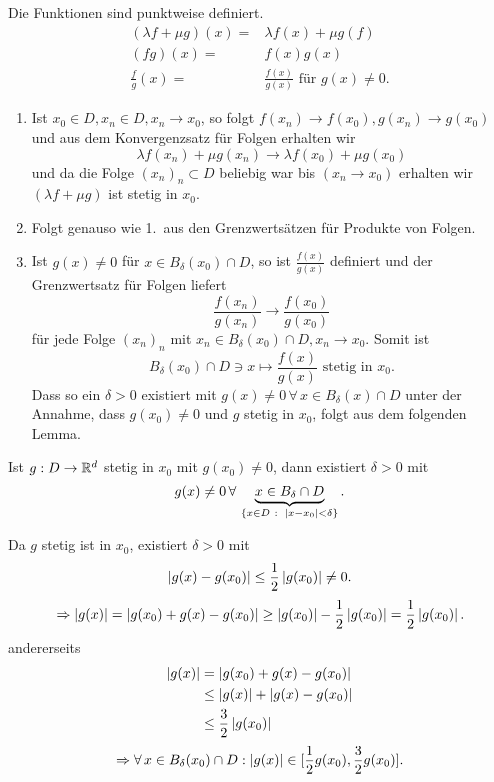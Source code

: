 \documentclass[../ana1.tex]{subfiles}
\begin{document}
\begin{bew}
    Die Funktionen sind punktweise definiert.
    \begin{align*}
        (\lambda f + \mu g)(x) = &\lambda f(x) + \mu g(f) \\
        (f g)(x) = &f(x) g(x) \\
        \frac{f}{g}(x) = &\frac{f(x)}{g(x)} \text{ für } g(x) \neq 0.
    \end{align*}
    \begin{enumerate}
        \item Ist \( x_0 \in D, x_n \in D, x_n \rightarrow x_0 \), 
        so folgt \( f(x_n) \rightarrow f(x_0), g(x_n) \rightarrow g(x_0) \)
        und aus dem Konvergenzsatz für Folgen erhalten wir
        \[ \lambda f(x_n) + \mu g(x_n) \rightarrow 
        \lambda f(x_0) + \mu g(x_0) \]
        und da die Folge \( {(x_n)}_n \subset D \) beliebig war 
        bis \( (x_n \rightarrow x_0) \) erhalten wir 
        \( (\lambda f + \mu g) \) ist stetig in \( x_0 \).
        \item Folgt genauso wie 1.\ aus den Grenzwertsätzen 
        für Produkte von Folgen.
        \item Ist \( g(x) \neq 0 \) für \( x\in B_\delta(x_0) \cap D \),
        so ist \( \frac{f(x)}{g(x)} \) definiert und der Grenzwertsatz
        für Folgen liefert
        \[ \frac{f(x_n)}{g(x_n)} \rightarrow \frac{f(x_0)}{g(x_0)} \]
        für jede Folge \( {(x_n)}_n \) mit \( x_n \in B_\delta(x_0) 
        \cap D, x_n \rightarrow x_0 \). Somit ist 
        \[ B_\delta(x_0) \cap D \ni x \mapsto \frac{f(x)}{g(x)} 
        \text{ stetig in } x_0. \]
        Dass so ein \( \delta > 0 \) existiert mit \( g(x) \neq 0 
        \,\forall \, x \in B_\delta(x) \cap D \) unter der Annahme, 
        dass \( g(x_0) \neq 0 \) und \(g\) stetig in \( x_0 \), 
        folgt aus dem folgenden Lemma.
    \end{enumerate}
\end{bew}
\begin{lem}
    Ist \( g: D\rightarrow \mathbb{R}^d \) stetig in \( x_0 \) mit 
    \( g(x_0) \neq 0 \), dann existiert \( \delta > 0 \) mit 
    \[ g(x) \neq 0 \,\forall \, \underbrace{x\in B_\delta \cap D
    }_{ \{x\in D \;\colon \; \left|x-x_0\right| < \delta \} }. \]
\end{lem}
\begin{bew}
    Da \( g \) stetig ist in \( x_0 \), existiert \( \delta > 0 \) mit 
    \[ \left| g(x) - g(x_0) \right| \leq \frac{1}{2} \left|g(x_0)\right| \neq 0. \]
    \[ \Rightarrow \left| g(x) \right| = \left| g(x_0) + g(x) - g(x_0) \right| \geq 
    \left|g(x_0)\right| - \frac{1}{2} \left|g(x_0)\right| = \frac{1}{2} \left| g(x_0) \right|. \]
    andererseits 
    \begin{align*}
        \left|g(x)\right| &= \left| g(x_0) + g(x) - g(x_0) \right| \\
        &\leq \left|g(x)\right| + \left| g(x) - g(x_0) \right| \\
        &\leq \frac{3}{2} \left| g(x_0) \right|
    \end{align*}
    \[ \Rightarrow \forall \, x\in B_\delta(x_0) \cap D : 
    \left|g(x)\right| \in [ \frac{1}{2} g(x_0), \frac{3}{2} g(x_0) ]. \]
\end{bew}
\end{document}
